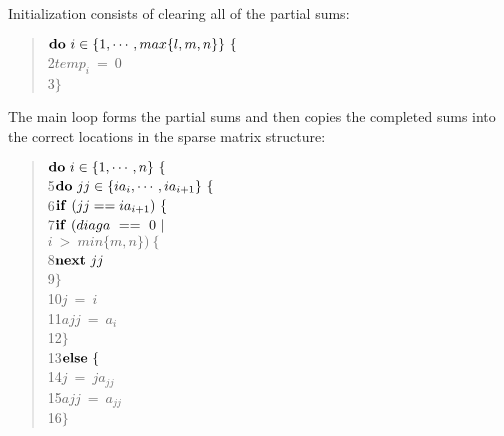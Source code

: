 Initialization consists of clearing all of the partial sums:
\begin{quote}\hspace*{ 4em}$ {\bf do}\ i\in\{1,\cdots,max\{l,m,n\}\}\ \{ $ \\
 2\hspace*{ 8em}$     temp_{i}\ =\ 0 $ \\
 3\hspace*{ 8em}$     \} $
\end{quote}     

The main loop forms the partial sums and then copies the completed sums into
the correct locations in the sparse matrix structure:
\begin{quote}\hspace*{ 4em}$ {\bf do}\ i\in\{1,\cdots,n\}\ \{ $ \\
 5\hspace*{ 8em}$      {\bf do}\ jj\in\{ia_{i},\cdots,ia_{i+1}\}\ \{ $ \\
 6\hspace*{12em}$         {\bf if}\ (jj == ia_{i+1})\ \{ $ \\
 7\hspace*{16em}$             {\bf if}\ (diaga\ ==\ 0\ | $\\
  \hspace*{18em}$                        i\ >\ min\{m,n\})\ \{ $ \\
 8\hspace*{20em}$                 {\bf next}\ jj $ \\
 9\hspace*{20em}$                 \} $ \\
10\hspace*{16em}$             j\ =\ i $ \\
11\hspace*{16em}$             ajj\ =\ a_{i} $ \\
12\hspace*{16em}$             \} $ \\
13\hspace*{12em}$         {\bf else}\ \{ $ \\
14\hspace*{16em}$             j\ =\ ja_{jj} $ \\
15\hspace*{16em}$             ajj\ =\ a_{jj} $ \\
16\hspace*{16em}$             \} $ \\

\end{quote}
